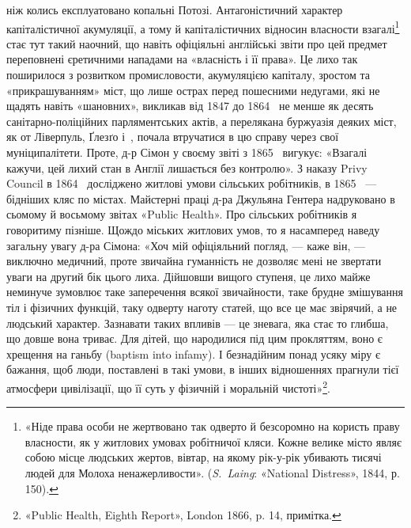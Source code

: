 \parcont{}  %
ніж колись експлуатовано копальні Потозі. Антагоністичний
характер капіталістичної акумуляції, а тому й капіталістичних
відносин власности взагалі\footnote{
«Ніде права особи не жертвовано так одверто й безсоромно на
користь праву власности, як у житлових умовах робітничої кляси. Кожне
велике місто являє собою місце людських жертов, вівтар, на якому рік-у-рік
убивають тисячі людей для Молоха ненажерливости». (\emph{S.~Laing}:
«National Distress», 1844, р. 150).
} стає тут такий наочний, що навіть
офіціяльні англійські звіти про цей предмет переповнені єретичними
нападами на «власність і її права». Це лихо так поширилося
з розвитком промисловости, акумуляцією капіталу, зростом
та «прикрашуванням» міст, що лише острах перед пошесними
недугами, які не щадять навіть «шановних», викликав від 1847
до 1864~ не менше як десять санітарно-поліційних парляментських
актів, а перелякана буржуазія деяких міст, як от Ліверпуль,
Ґлезґо і~, почала втручатися в цю справу через свої
муніципалітети. Проте, д-р Сімон у своєму звіті з 1865~ вигукує:
«Взагалі кажучи, цей лихий стан в Англії лишається без
контролю». З наказу Privy Council в 1864~ досліджено житлові
умови сільських робітників, в 1865~ — бідніших кляс по містах.
Майстерні праці д-ра Джульяна Гентера надруковано в
сьомому й восьмому звітах «Public Health». Про сільських робітників
я говоритиму пізніше. Щождо міських житлових умов,
то я насамперед наведу загальну увагу д-ра Сімона: «Хоч
мій офіціяльний погляд, — каже він, — виключно медичний, проте
звичайна гуманність не дозволяє мені не звертати уваги на другий
бік цього лиха. Дійшовши вищого ступеня, це лихо майже
неминуче зумовлює таке заперечення всякої звичайности, таке
брудне змішування тіл і фізичних функцій, таку одверту наготу
статей, що все це має звірячий, а не людський характер. Зазнавати
таких впливів — це зневага, яка стає то глибша, що довше
вона триває. Для дітей, що народилися під цим прокляттям,
воно є хрещення на ганьбу (baptism into infamy). І безнадійним
понад усяку міру є бажання, щоб люди, поставлені в такі умови,
в інших відношеннях прагнули тієї атмосфери цивілізації, що її
суть у фізичній і моральній чистоті»\footnote{
«Public Health, Eighth Report», London 1866, p. 14, примітка.
}.

